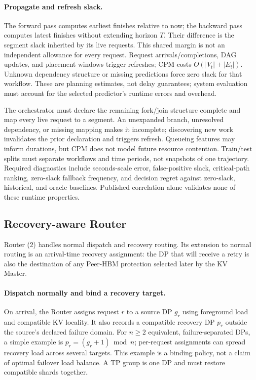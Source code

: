 \paragraph{Propagate and refresh slack.}
The forward pass computes earliest finishes relative to now; the
backward pass computes latest finishes without extending horizon $T$.
Their difference is the segment slack inherited by its live requests.
This shared margin is not an independent allowance for every request.
Request arrivals/completions, DAG updates, and placement windows trigger
refreshes; CPM costs $O(|V_t|+|E_t|)$. Unknown dependency structure or missing
predictions force zero slack for that workflow. These are planning
estimates, not delay guarantees; system evaluation must account for
the selected predictor's runtime errors and overhead.

The orchestrator must declare the remaining fork/join structure complete
and map every live request to a segment. An unexpanded branch, unresolved
dependency, or missing mapping makes it incomplete; discovering new work
invalidates the prior declaration and triggers refresh. Queueing features
may inform durations, but CPM does not model future resource contention.
Train/test splits must separate workflows and time periods, not snapshots
of one trajectory. Required diagnostics include seconds-scale error,
false-positive slack, critical-path ranking, zero-slack fallback frequency,
and decision regret against zero-slack, historical, and oracle baselines.
Published correlation alone validates none of these runtime properties.
\subsection{Recovery-aware Router}
\label{sec:parallel-recovery}
\label{sec:recovery-router}

Router (2) handles normal dispatch and recovery routing.
Its extension to normal routing is an arrival-time recovery assignment:
the DP that will receive a retry is also the destination of any
Peer-HBM protection selected later by the KV Master.

\paragraph{Dispatch normally and bind a recovery target.}
On arrival, the Router assigns request $r$ to a source DP $g_r$ using
foreground load and compatible KV locality. It also records a compatible
recovery DP $p_r$ outside the source's declared failure domain.
For $n\ge2$ equivalent, failure-separated DPs, a simple example is
$p_r=(g_r+1)\bmod n$; per-request assignments can spread recovery load
across several targets. This example is a binding policy, not a claim of
optimal failover load balance. A TP group is one DP and must restore
compatible shards together.

